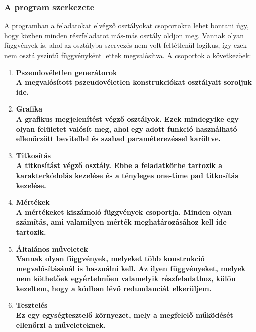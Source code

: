 \documentclass[12pt]{article}
\begin{document}
\subsubsection{A program szerkezete}
A programban a feladatokat elvégző osztályokat csoportokra lehet bontani úgy, hogy közben minden részfeladatot más-más osztály oldjon meg. Vannak olyan függvények is, ahol az osztályba szervezés nem volt feltétlenül logikus, így ezek nem osztályszintű függvényként lettek megvalósítva. A csoportok a következőek:
\begin{enumerate}
	\item \bfseries Pszeudovéletlen generátorok \\
	\normalfont A megvalósított pszeudovéletlen konstrukciókat osztályait soroljuk ide.
	\item \bfseries Grafika \\
	\normalfont A grafikus megjelenítést végző osztályok. Ezek mindegyike egy olyan felületet valósít meg, ahol egy adott funkció használható ellenőrzött bevitellel és szabad paraméterezéssel karöltve.
	\item \bfseries Titkosítás \\
	\normalfont A titkosítást végző osztály. Ebbe a feladatkörbe tartozik a karakterkódolás kezelése és a tényleges one-time pad titkosítás kezelése.
	\item \bfseries Mértékek \\
	\normalfont A mértékeket kiszámoló függvények csoportja. Minden olyan számítás, ami valamilyen mérték meghatározásához kell ide tartozik.
	\item \bfseries Általános műveletek \\
	\normalfont Vannak olyan függvények, melyeket több konstrukció megvalósításánál is használni kell. Az ilyen függvényeket, melyek nem köthetőek egyértelműen valamelyik részfeladathoz, külön kezeltem, hogy a kódban lévő redundanciát elkerüljem.
	\item \bfseries Tesztelés \\
	\normalfont Ez egy egységtesztelő környezet, mely a megfelelő működését ellenőrzi a műveleteknek.
\end{enumerate}
\end{document}
